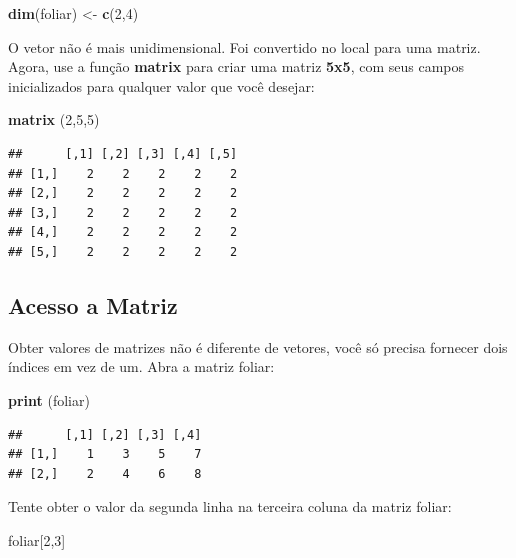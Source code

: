 \documentclass[
]{book}
\newenvironment{Shaded}{\begin{snugshade}}{\end{snugshade}}
\newcommand{\DecValTok}[1]{\textcolor[rgb]{0.00,0.00,0.81}{#1}}
\newcommand{\KeywordTok}[1]{\textcolor[rgb]{0.13,0.29,0.53}{\textbf{#1}}}
\newcommand{\NormalTok}[1]{#1}
\newcommand{\StringTok}[1]{\textcolor[rgb]{0.31,0.60,0.02}{#1}}
\begin{document}
\begin{Shaded}
\begin{Highlighting}[]
\KeywordTok{dim}\NormalTok{(foliar) <-}\StringTok{ }\KeywordTok{c}\NormalTok{(}\DecValTok{2}\NormalTok{,}\DecValTok{4}\NormalTok{)}
\end{Highlighting}
\end{Shaded}

O vetor não é mais unidimensional. Foi convertido no local para uma matriz.
Agora, use a função \textbf{matrix} para criar uma matriz \textbf{5x5}, com seus campos inicializados para qualquer valor que você desejar:

\begin{Shaded}
\begin{Highlighting}[]
\KeywordTok{matrix}\NormalTok{ (}\DecValTok{2}\NormalTok{,}\DecValTok{5}\NormalTok{,}\DecValTok{5}\NormalTok{)}
\end{Highlighting}
\end{Shaded}

\begin{verbatim}
##      [,1] [,2] [,3] [,4] [,5]
## [1,]    2    2    2    2    2
## [2,]    2    2    2    2    2
## [3,]    2    2    2    2    2
## [4,]    2    2    2    2    2
## [5,]    2    2    2    2    2
\end{verbatim}

\hypertarget{acesso-a-matriz}{%
\subsection{Acesso a Matriz}\label{acesso-a-matriz}}

Obter valores de matrizes não é diferente de vetores, você só precisa fornecer dois índices em vez de um. Abra a matriz foliar:

\begin{Shaded}
\begin{Highlighting}[]
\KeywordTok{print}\NormalTok{ (foliar)}
\end{Highlighting}
\end{Shaded}

\begin{verbatim}
##      [,1] [,2] [,3] [,4]
## [1,]    1    3    5    7
## [2,]    2    4    6    8
\end{verbatim}

Tente obter o valor da segunda linha na terceira coluna da matriz foliar:

\begin{Shaded}
\begin{Highlighting}[]
\NormalTok{foliar[}\DecValTok{2}\NormalTok{,}\DecValTok{3}\NormalTok{]}
\end{Highlighting}
\end{Shaded}
\end{document}

